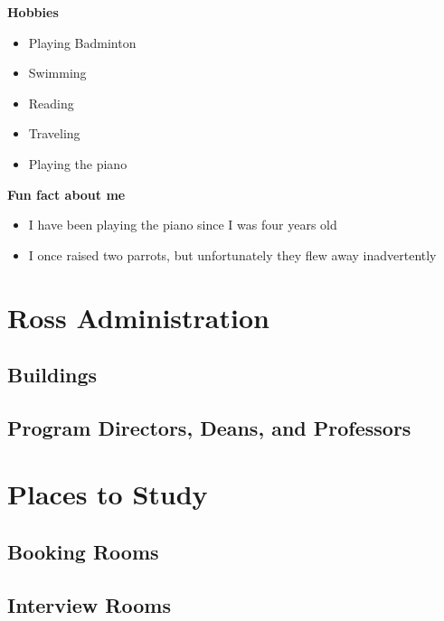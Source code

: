 \documentclass[
]{book}
\begin{document}
\textbf{Hobbies}

\begin{itemize}
\item
  Playing Badminton
\item
  Swimming
\item
  Reading
\item
  Traveling
\item
  Playing the piano
\end{itemize}

\textbf{Fun fact about me}

\begin{itemize}
\item
  I have been playing the piano since I was four years old
\item
  I once raised two parrots, but unfortunately they flew away inadvertently
\end{itemize}

\hypertarget{ross-administration}{%
\chapter{Ross Administration}\label{ross-administration}}

\hypertarget{buildings}{%
\section{Buildings}\label{buildings}}

\hypertarget{program-directors-deans-and-professors}{%
\section{Program Directors, Deans, and Professors}\label{program-directors-deans-and-professors}}

\hypertarget{places-to-study}{%
\chapter{Places to Study}\label{places-to-study}}

\hypertarget{booking-rooms}{%
\section{Booking Rooms}\label{booking-rooms}}

\hypertarget{interview-rooms}{%
\section{Interview Rooms}\label{interview-rooms}}
\end{document}
